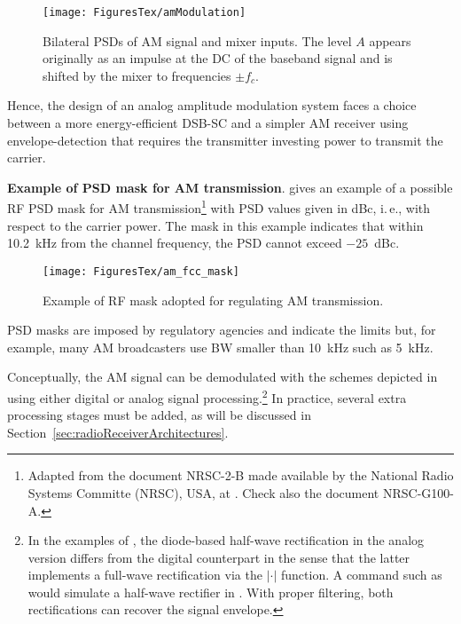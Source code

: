 \begin{figure}[htbp]
\centering
\texttt{[image: FiguresTex/amModulation]}
\caption[Bilateral PSDs of AM signal and mixer inputs.]{Bilateral PSDs of AM signal and mixer inputs. The level $A$ appears originally as an impulse at the DC of the baseband signal and is shifted by the mixer to frequencies $\pm f_c$.\label{fig:amModulation}}
\end{figure}

Hence, the design of an analog amplitude modulation system faces a choice between a more energy-efficient DSB-SC and a simpler AM receiver using envelope-detection that requires the transmitter investing power to transmit the carrier.

\bExample \textbf{Example of PSD mask for AM transmission}.
 gives an example of a possible RF PSD mask for AM transmission\footnote{Adapted from the document NRSC-2-B made available by the National Radio Systems Committe (NRSC), USA, at . Check also the document NRSC-G100-A.} with PSD values given in dBc, i.\,e., with respect to the carrier power. The mask in this example indicates that within 10.2~kHz from the channel frequency, the PSD cannot exceed $-25$~dBc.

\begin{figure}[htbp]
	\centering
		\texttt{[image: FiguresTex/am\_fcc\_mask]}		
	\caption{Example of RF mask adopted for regulating AM transmission.\label{fig:am_fcc_mask}}
\end{figure}

PSD masks are imposed by regulatory agencies and indicate the limits but, for example, many AM broadcasters use BW smaller than 10~kHz such as 5~kHz.
\eExample 

Conceptually, the AM signal can be demodulated with the schemes depicted in  using either digital or analog signal processing.\footnote{In the examples of , the diode-based half-wave rectification in the analog version differs from the digital counterpart in the sense that the latter implements a full-wave rectification via the $|\cdot|$ function. A command such as  would simulate a half-wave rectifier in {\matlab}. With proper filtering, both rectifications can recover the signal envelope.}
In practice, several extra processing stages must be added, as will be discussed in Section~\ref{sec:radioReceiverArchitectures}.

